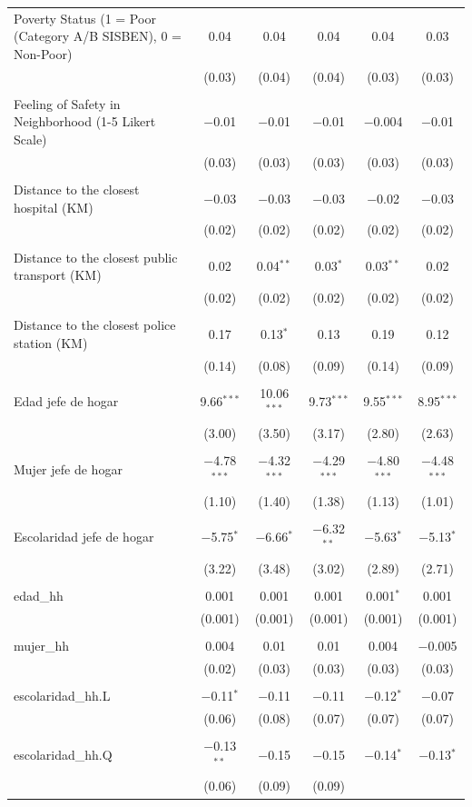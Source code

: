 \begin{table}[H]
\begin{tabularx}{0.9\textwidth}{@{\extracolsep{-7pt}}lccccc}
 Poverty Status (1 = Poor (Category A/B SISBEN), 0 = Non-Poor) & 0.04 & 0.04 & 0.04 & 0.04 & 0.03 \\    & (0.03) & (0.04) & (0.04) & (0.03) & (0.03) \\    & & & & & \\   Feeling of Safety in Neighborhood (1-5 Likert Scale) & $-$0.01 & $-$0.01 & $-$0.01 & $-$0.004 & $-$0.01 \\    & (0.03) & (0.03) & (0.03) & (0.03) & (0.03) \\    & & & & & \\   Distance to the closest hospital (KM) & $-$0.03 & $-$0.03 & $-$0.03 & $-$0.02 & $-$0.03 \\    & (0.02) & (0.02) & (0.02) & (0.02) & (0.02) \\    & & & & & \\   Distance to the closest public transport  (KM) & 0.02 & 0.04$^{**}$ & 0.03$^{*}$ & 0.03$^{**}$ & 0.02 \\    & (0.02) & (0.02) & (0.02) & (0.02) & (0.02) \\    & & & & & \\   Distance to the closest police station (KM) & 0.17 & 0.13$^{*}$ & 0.13 & 0.19 & 0.12 \\    & (0.14) & (0.08) & (0.09) & (0.14) & (0.09) \\    & & & & & \\   Edad jefe de hogar & 9.66$^{***}$ & 10.06$^{***}$ & 9.73$^{***}$ & 9.55$^{***}$ & 8.95$^{***}$ \\    & (3.00) & (3.50) & (3.17) & (2.80) & (2.63) \\    & & & & & \\   Mujer jefe de hogar & $-$4.78$^{***}$ & $-$4.32$^{***}$ & $-$4.29$^{***}$ & $-$4.80$^{***}$ & $-$4.48$^{***}$ \\    & (1.10) & (1.40) & (1.38) & (1.13) & (1.01) \\    & & & & & \\   Escolaridad jefe de hogar & $-$5.75$^{*}$ & $-$6.66$^{*}$ & $-$6.32$^{**}$ & $-$5.63$^{*}$ & $-$5.13$^{*}$ \\    & (3.22) & (3.48) & (3.02) & (2.89) & (2.71) \\    & & & & & \\   edad\_hh & 0.001 & 0.001 & 0.001 & 0.001$^{*}$ & 0.001 \\    & (0.001) & (0.001) & (0.001) & (0.001) & (0.001) \\    & & & & & \\   mujer\_hh & 0.004 & 0.01 & 0.01 & 0.004 & $-$0.005 \\    & (0.02) & (0.03) & (0.03) & (0.03) & (0.03) \\    & & & & & \\   escolaridad\_hh.L & $-$0.11$^{*}$ & $-$0.11 & $-$0.11 & $-$0.12$^{*}$ & $-$0.07 \\    & (0.06) & (0.08) & (0.07) & (0.07) & (0.07) \\    & & & & & \\   escolaridad\_hh.Q & $-$0.13$^{**}$ & $-$0.15 & $-$0.15 & $-$0.14$^{*}$ & $-$0.13$^{*}$ \\    & (0.06) & (0.09) & (0.09) & 
\end{tabularx}
\end{table}
